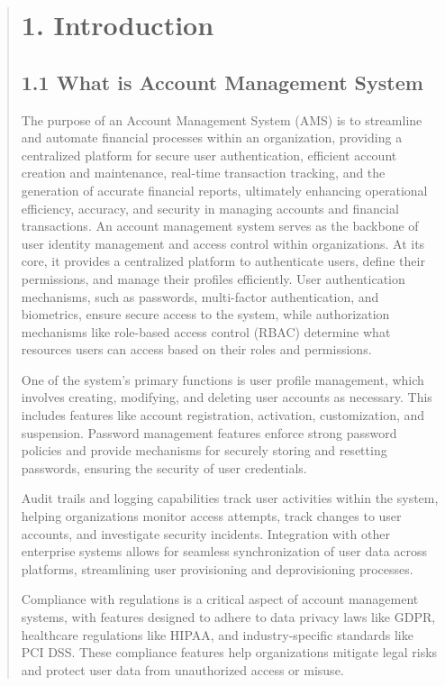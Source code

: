 \documentclass[12pt]{report}
\begin{document}
	
	\begin{quote}
		\section{1. Introduction}
		\subsection{1.1 What is Account Management System}
     	The purpose of an Account Management System (AMS) is to streamline and automate financial processes within an organization, providing a centralized platform for secure user authentication, efficient account creation and maintenance, real-time transaction tracking, and the generation of accurate financial reports, ultimately enhancing operational efficiency, accuracy, and security in managing accounts and financial transactions.
     	An account management system serves as the backbone of user identity management and access control within organizations. At its core, it provides a centralized platform to authenticate users, define their permissions, and manage their profiles efficiently. User authentication mechanisms, such as passwords, multi-factor authentication, and biometrics, ensure secure access to the system, while authorization mechanisms like role-based access control (RBAC) determine what resources users can access based on their roles and permissions.
     	
     	One of the system's primary functions is user profile management, which involves creating, modifying, and deleting user accounts as necessary. This includes features like account registration, activation, customization, and suspension. Password management features enforce strong password policies and provide mechanisms for securely storing and resetting passwords, ensuring the security of user credentials.
     	
     	Audit trails and logging capabilities track user activities within the system, helping organizations monitor access attempts, track changes to user accounts, and investigate security incidents. Integration with other enterprise systems allows for seamless synchronization of user data across platforms, streamlining user provisioning and deprovisioning processes.
     	
     	Compliance with regulations is a critical aspect of account management systems, with features designed to adhere to data privacy laws like GDPR, healthcare regulations like HIPAA, and industry-specific standards like PCI DSS. These compliance features help organizations mitigate legal risks and protect user data from unauthorized access or misuse.
     	

\end{quote}
\end{document}
